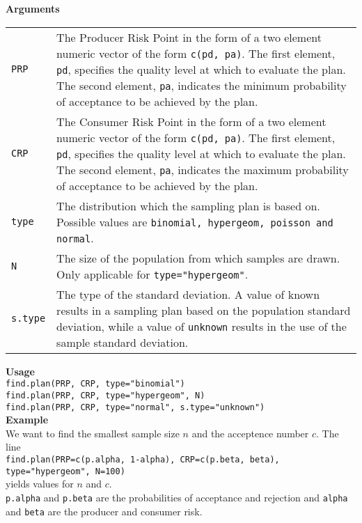 \textbf{Arguments}\\
\begin{table}[H]
  \scriptsize
  \begin{tabularx}{\linewidth}{lX}
    \texttt{PRP} &
    The Producer Risk Point in the form of a two element numeric vector of the form \texttt{c(pd, pa)}. The first element, \texttt{pd}, specifies the quality level at which to evaluate the plan. The second element, \texttt{pa}, indicates the minimum probability of acceptance to be achieved by the plan.\\
    \texttt{CRP} &
    The Consumer Risk Point in the form of a two element numeric vector of the form \texttt{c(pd, pa)}. The first element, \texttt{pd}, specifies the quality level at which to evaluate the plan. The second element, \texttt{pa}, indicates the maximum probability of acceptance to be achieved by the plan.\\
    \texttt{type} &
    The distribution which the sampling plan is based on. Possible values are \texttt{binomial, hypergeom, poisson and normal}.\\
    \texttt{N} &
    The size of the population from which samples are drawn. Only applicable for \texttt{type="hypergeom"}.\\
    \texttt{s.type} &
    The type of the standard deviation. A value of known results in a sampling plan based on the population standard deviation, while a value of \texttt{unknown} results in the use of the sample standard deviation.
  \end{tabularx}
\end{table}

\textbf{Usage}\\
\texttt{find.plan(PRP, CRP, type="binomial")}\\
\texttt{find.plan(PRP, CRP, type="hypergeom", N)}\\
\texttt{find.plan(PRP, CRP, type="normal", s.type="unknown")}\\

\textbf{Example}\\
We want to find the smallest sample size $n$ and the acceptence number $c$. The line\\
\texttt{find.plan(PRP=c(p.alpha, 1-alpha), CRP=c(p.beta, beta), type="hypergeom", N=100)}\\
yields values for $n$ and $c$.\\
\texttt{p.alpha} and \texttt{p.beta} are the probabilities of acceptance and rejection and \texttt{alpha} and \texttt{beta} are the producer and consumer risk.\\

